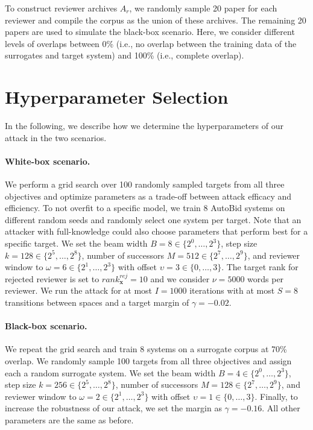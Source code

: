 \documentclass[letterpaper,twocolumn,10pt]{article}
\newcommand{\bow}{\textbf{x}}
\newcommand{\submission}{\bow}
\newcommand{\reviewer}{r}
\newcommand{\archive}{A}
\newcommand{\reviewerwindow}{\omega}
\newcommand{\revieweroffset}{\upsilon}
\newcommand{\reviewerwordsmax}{\nu}
\newcommand{\stepsize}{k}
\newcommand{\nosuccessors}{M}
\newcommand{\beamwidth}{B}
\newcommand{\maxitr}{I}
\newcommand{\switches}{S}
\newcommand{\margin}{\gamma}
\begin{document}
To construct reviewer archives $\archive_\reviewer$, we randomly sample 20 paper for each reviewer and compile the corpus as the union of these archives. The remaining 20 papers are used to simulate the black-box scenario. Here, we consider different levels of overlaps between 0\% (i.e., no overlap between the training data of the {surrogates\EndAccSupp{}} and target system) and 100\% (i.e., complete overlap).

\section{Hyperparameter Selection}
\label{app:hyperparameters}
\vspace{-0.5em}
In the following, we describe how we determine the {hyperparameters\EndAccSupp{}} of our attack in the two scenarios.

\paragraph{White-box scenario.}
We perform a grid search over 100 randomly sampled targets from all three objectives and optimize parameters as a trade-off between attack efficacy and efficiency. To not {overfit\EndAccSupp{}} to a specific model, we train 8 AutoBid systems on different random seeds and randomly select one system per target. Note that an attacker with full-knowledge could also choose parameters that perform best for a specific target. We set the beam {width\EndAccSupp{}} $\beamwidth = 8 \in \{2^0, \dots, 2^3\}$, step size $\stepsize = 128 \in \{2^5, \dots, 2^8\}$, number of successors $\nosuccessors = 512 \in \{2^7,\dots, 2^{9}\}$, and reviewer window to $\reviewerwindow = 6 \in \{2^1, \dots, 2^3\}$ with {offset\EndAccSupp{}} $\revieweroffset = 3 \in \{0, \dots, 3\}$. The target rank for rejected reviewer is set to $rank^{rej}_{\submission} = 10$ and we consider $\reviewerwordsmax = 5000$ words per reviewer. We run the attack for at most $\maxitr = 1000$ iterations with at most $\switches = 8$ transitions between spaces and a target margin of $\margin = -0.02$. 

\paragraph{Black-box scenario.}
We repeat the grid search and train 8 systems on a {surrogate\EndAccSupp{}} corpus at 70\% overlap. We randomly sample 100 targets from all three objectives and assign each a random {surrogate\EndAccSupp{}} system. We set the beam width $\beamwidth = 4 \in \{2^0, \dots, 2^3\}$, step size $\stepsize = 256 \in \{2^5, \dots, 2^8\}$, number of successors $\nosuccessors = 128 \in \{2^7,\dots, 2^{9}\}$, and reviewer window to $\reviewerwindow = 2 \in \{2^1, \dots, 2^3\}$ with {offset\EndAccSupp{}} $\revieweroffset = 1 \in \{0, \dots, 3\}$. Finally, to increase the robustness of our attack, we set the margin as $\margin = -0.16$. All other parameters are the same as before.
\end{document}
